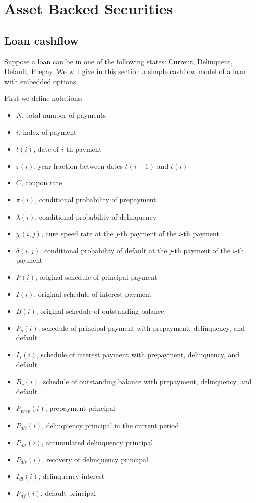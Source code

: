 \chapter{Asset Backed Securities}

\section{Loan cashflow}
Suppose a loan can be in one of the following states: Current, Delinquent,
Default, Prepay. We will give in this section a simple cashflow model of a loan
with embedded options.

First we define notations:

\begin{itemize}
\item $N$, total number of payments
\item $i$, index of payment
\item $t(i)$, date of $i$-th payment
\item $\tau(i)$, year fraction between dates $t(i-1)$ and $t(i)$
\item $C$, coupon rate
\item $\pi(i)$, conditional probability of prepayment
\item $\lambda(i)$, conditional probability of delinquency
\item $\chi(i,j)$, cure speed rate at the $j$-th payment of the $i$-th payment
\item $\delta(i,j)$, conditional probability of default at the $j$-th payment 
      of the $i$-th payment
\item $P(i)$, original schedule of principal payment
\item $I(i)$, original schedule of interest payment
\item $B(i)$, original schedule of outstanding balance 
\item $P_s(i)$, schedule of principal payment with prepayment, delinquency, and
default
\item $I_s(i)$, schedule of interest payment with prepayment, delinquency, and
default
\item $B_s(i)$, schedule of outstanding balance with prepayment, delinquency, and
default
\item $P_{prep}(i)$, prepayment principal
\item $P_{dlc}(i)$, delinquency principal in the current period
\item $P_{dlt}(i)$, accumulated delinquency principal
\item $P_{dlr}(i)$, recovery of delinquency principal
\item $I_{dl}(i)$, delinquency interest
\item $P_{df}(i)$, default principal 
\end{itemize}

